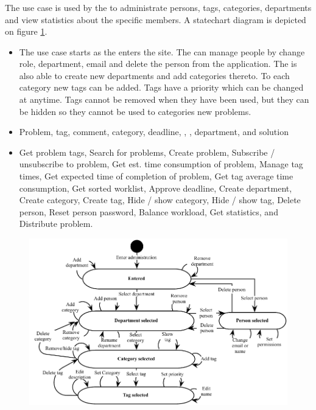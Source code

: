 \subsubsection{\tucadmin[c]} The use case \tucadmin[] is used by the \sadmin[] to administrate persons, tags, categories, departments and view statistics about the specific \astaff members. A statechart diagram is depicted on figure \ref{fig:use_case_diagram}.

\begin{itemize}
\item{} The use case starts as the \sadmin{} enters the site. The \admin[] can manage people by change role, department, email and delete the person from the application. The \admin[] is also able to create new  departments and add categories thereto. To each category new tags can be added. Tags have a priority which can be changed at anytime. Tags cannot be removed when they have been used, but they can be hidden so they cannot be used to categories new problems.  

\item{} Problem, tag, comment, category, deadline, \aclient[], \astaff[], department, and solution

\item{} Get problem tags, Search for problems, Create problem, Subscribe / unsubscribe to problem, Get est. time consumption of problem, Manage tag times, Get expected time of completion of problem, Get tag average time consumption, Get sorted worklist, Approve deadline, Create department, Create category, Create tag, Hide / show category, Hide / show tag, Delete person, Reset person password, Balance workload, Get statistics, and Distribute problem. 
\end{itemize}


\begin{figure}[htbp]
\begin{center}
 \includegraphics[scale=0.8]{input/application_domain_analysis/admin_use_case}
\label{fig:use_case_diagram}
\end{center}
\end{figure}